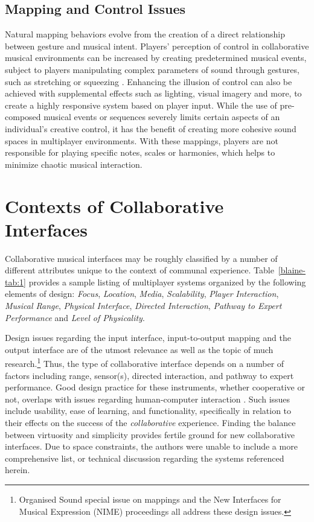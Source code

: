 \subsection{Mapping and Control Issues }

Natural mapping behaviors evolve from the creation of a
direct relationship between gesture and musical intent. Players' perception of
control in collaborative musical environments can be increased by creating
predetermined musical events, subject to players manipulating complex parameters
of sound through gestures, such as stretching or squeezing \cite{Weinberg:2001}. Enhancing the
illusion of control can also be achieved with supplemental effects such as
lighting, visual imagery and more, to create a highly responsive system based on
player input.  While the use of pre-composed musical events or sequences severely
limits certain aspects of an individual's creative control, it has the benefit of
creating more cohesive sound spaces in multiplayer environments. With these
mappings, players are not responsible for playing specific notes, scales or
harmonies, which helps to minimize chaotic musical interaction.

\section{Contexts of Collaborative Interfaces}

Collaborative musical interfaces may be roughly classified by a number of
different attributes unique to the context of communal experience. Table~\ref{blaine-tab:1}
provides a sample listing of multiplayer systems organized by the following
elements of design: \textit{Focus}, \textit{Location}, \textit{Media},
\textit{Scalability}, \textit{Player} \textit{Interaction}, \textit{Musical
Range}, \textit{Physical Interface}, \textit{Directed Interaction},
\textit{Pathway to Expert Performance} and \textit{Level of Physicality}.

Design issues regarding the input interface, input-to-output mapping and the
output interface are of the utmost relevance as well as the topic of much
research.\footnote{Organised Sound special issue on mappings and the New
Interfaces for Musical Expression (NIME) proceedings all address these design
issues.} Thus, the type of collaborative interface depends on a number of factors
including range, sensor(s), directed interaction, and pathway to expert
performance.  Good design practice for these instruments, whether cooperative or
not, overlaps with issues regarding human-computer interaction \cite{Orio:2001}. Such issues
include usability, ease of learning, and functionality, specifically in relation
to their effects on the success of the \textit{collaborative} experience. Finding
the balance between virtuosity and simplicity provides fertile ground for new
collaborative interfaces.  Due to space constraints, the authors were unable to
include a more comprehensive list, or technical discussion regarding the systems
referenced herein.


